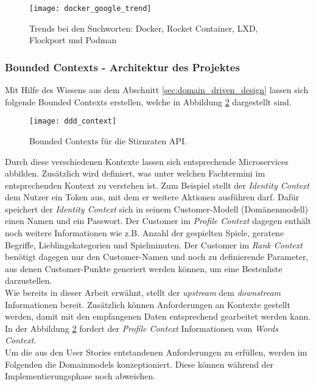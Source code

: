 {\begin{figure}[ht]
	\centering
	\texttt{[image: docker\_google\_trend]}
	\caption[Docker Google Trends] {Trends bei den Suchworten: Docker, Rocket Container, LXD, Flockport und Podman}
	\label{fig:docker_google_trends}
\end{figure}

\subsubsection{Bounded Contexts - Architektur des Projektes}
Mit Hilfe des Wissens aus dem Abschnitt \ref{sec:domain_driven_design} lassen sich folgende Bounded Contexts erstellen, welche in Abbildung \ref{fig:ddd_context} dargestellt sind.

\begin{figure}[ht]
	\centering
	\texttt{[image: ddd\_context]}
	\caption[Bounded Contexts für Stirnraten] {Bounded Contexts für die Stirnraten API.}
	\label{fig:ddd_context}
\end{figure}

Durch diese verschiedenen Kontexte lassen sich entsprechende Microservices abbilden. Zusätzlich wird definiert, was unter welchen Fachtermini im entsprechenden Kontext zu verstehen ist. Zum Beispiel stellt der \textit{Identity Context} dem Nutzer ein Token aus, mit dem er weitere Aktionen ausführen darf. Dafür speichert der \textit{Identity Context} sich in seinem Customer-Modell (Domänenmodell) einen Namen und ein Passwort. Der Customer im \textit{Profile Context} dagegen enthält noch weitere Informationen wie z.B. Anzahl der gespielten Spiele, geratene Begriffe, Lieblingskategorien und Spielminuten. Der Customer im \textit{Rank Context} benötigt dagegen nur den Customer-Namen und noch zu definierende Parameter, aus denen Customer-Punkte generiert werden können, um eine Bestenliste darzustellen.\\

Wie bereits in dieser Arbeit erwähnt, stellt der \textit{upstream} dem \textit{downstream} Informationen bereit. Zusätzlich können Anforderungen an Kontexte gestellt werden, damit mit den empfangenen Daten entsprechend gearbeitet werden kann. In der Abbildung \ref{fig:ddd_context} fordert der \textit{Profile Context} Informationen vom \textit{Words Context}.  \\

Um die aus den User Stories entstandenen Anforderungen zu erfüllen, werden im Folgenden die Domainmodels konzeptioniert. Diese können während der Implementierungsphase noch abweichen. \\

}
